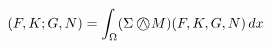 \documentclass[preview]{standalone}
\newcommand{\KN}{\mathbin{\bigcirc\mkern-15mu\wedge}}
\begin{document}
\begin{align*}
\special{dvisvgm:raw <g id='unique000'>}(F,K;G,N)=\int_\Omega(\Sigma\KN M)(F,K,G,N)\,dx\special{dvisvgm:raw </g>}
\end{align*}
\end{document}
